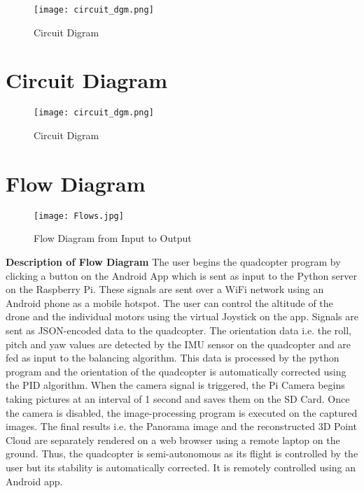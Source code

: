 \begin{figure}[H]
  \centering
  \texttt{[image: circuit\_dgm.png]}
  \caption{Circuit Digram}
  \label{circuit} 
\end{figure}

\section{Circuit Diagram}

\begin{figure}[H]
  \centering
  \texttt{[image: circuit\_dgm.png]}
  \caption{Circuit Digram}
  \label{circuit} 
\end{figure}


\section{Flow Diagram}
\begin{figure}[H]
  \centering
  \texttt{[image: Flows.jpg]}
  \caption{Flow Diagram from Input to Output}
  \label{Flow}	
\end{figure}

\textbf{Description of Flow Diagram}
\newline
The user begins the quadcopter program by clicking a button on the Android App which is sent as input to the Python server on the Raspberry Pi. These signals are sent over a WiFi network using an Android phone as a mobile hotspot. The user can control the altitude of the drone and the individual motors using the virtual Joystick on the app. Signals are sent as JSON-encoded data to the quadcopter. The orientation data i.e. the roll, pitch and yaw values are detected by the IMU sensor on the quadcopter and are fed as input to the balancing algorithm. This data is processed by the python program and the orientation of the quadcopter is automatically corrected using the PID algorithm. When the camera signal is triggered, the Pi Camera begins taking pictures at an interval of 1 second and saves them on the SD Card. Once the camera is disabled, the image-processing program is executed on the captured images. The final results i.e. the Panorama image and the reconstructed 3D Point Cloud are separately rendered on a web browser using a remote laptop on the ground. Thus, the quadcopter is semi-autonomous as its flight is controlled by the user but its stability is automatically corrected. It is remotely controlled using an Android app.



